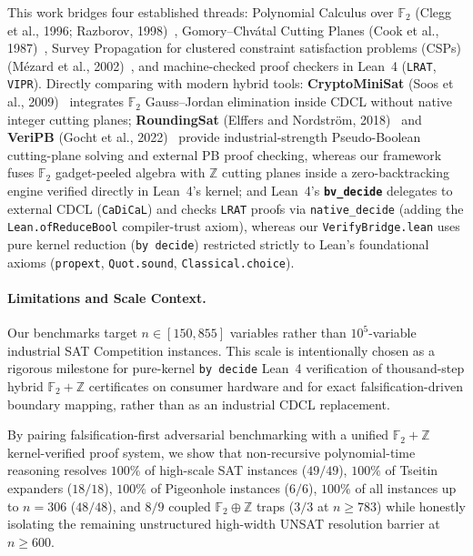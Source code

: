 \documentclass[11pt]{article}
\begin{document}
This work bridges four established threads: Polynomial Calculus over $\mathbb{F}_2$ (Clegg et al., 1996; Razborov, 1998)~\cite{clegg1996,razborov1998}, Gomory--Chv\'atal Cutting Planes (Cook et al., 1987)~\cite{cook1987}, Survey Propagation for clustered constraint satisfaction problems (CSPs) (M\'ezard et al., 2002)~\cite{mezard2002}, and machine-checked proof checkers in Lean~4 (\texttt{LRAT}, \texttt{VIPR}). Directly comparing with modern hybrid tools: \textbf{CryptoMiniSat} (Soos et al., 2009)~\cite{soos2009} integrates $\mathbb{F}_2$ Gauss--Jordan elimination inside CDCL without native integer cutting planes; \textbf{RoundingSat} (Elffers and Nordstr\"om, 2018)~\cite{elffers2018} and \textbf{VeriPB} (Gocht et al., 2022)~\cite{gocht2022} provide industrial-strength Pseudo-Boolean cutting-plane solving and external PB proof checking, whereas our framework fuses $\mathbb{F}_2$ gadget-peeled algebra with $\mathbb{Z}$ cutting planes inside a zero-backtracking engine verified directly in Lean~4's kernel; and Lean~4's \textbf{\texttt{bv\_decide}} delegates to external CDCL (\texttt{CaDiCaL}) and checks \texttt{LRAT} proofs via \texttt{native\_decide} (adding the \texttt{Lean.ofReduceBool} compiler-trust axiom), whereas our \texttt{VerifyBridge.lean} uses pure kernel reduction (\texttt{by decide}) restricted strictly to Lean's foundational axioms (\texttt{propext}, \texttt{Quot.sound}, \texttt{Classical.choice}).

\paragraph{Limitations and Scale Context.} Our benchmarks target $n \in [150, 855]$ variables rather than $10^5$-variable industrial SAT Competition instances. This scale is intentionally chosen as a rigorous milestone for pure-kernel \texttt{by decide} Lean~4 verification of thousand-step hybrid $\mathbb{F}_2 + \mathbb{Z}$ certificates on consumer hardware and for exact falsification-driven boundary mapping, rather than as an industrial CDCL replacement.

By pairing falsification-first adversarial benchmarking with a unified $\mathbb{F}_2 + \mathbb{Z}$ kernel-verified proof system, we show that non-recursive polynomial-time reasoning resolves $100\%$ of high-scale SAT instances ($49/49$), $100\%$ of Tseitin expanders ($18/18$), $100\%$ of Pigeonhole instances ($6/6$), $100\%$ of all instances up to $n = 306$ ($48/48$), and $8/9$ coupled $\mathbb{F}_2 \oplus \mathbb{Z}$ traps ($3/3$ at $n \ge 783$) while honestly isolating the remaining unstructured high-width UNSAT resolution barrier at $n \ge 600$.
\end{document}
